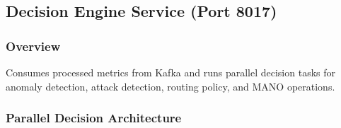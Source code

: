 \documentclass[10pt,a4paper]{article}
\begin{document}
\subsection{Decision Engine Service (Port 8017)}

\subsubsection{Overview}
Consumes processed metrics from Kafka and runs parallel decision tasks for anomaly detection, attack detection, routing policy, and MANO operations.

\subsubsection{Parallel Decision Architecture}
\end{document}
